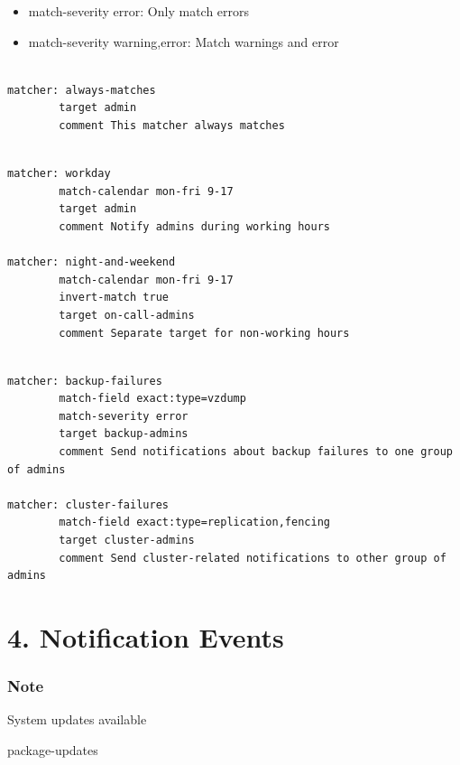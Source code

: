 \begin{itemize}[leftmargin=2cm]

	\item match-severity error: Only match errors

	\item match-severity warning,error: Match warnings and error

\end{itemize}

\begin{lstlisting}

matcher: always-matches
        target admin
        comment This matcher always matches

\end{lstlisting}

\begin{lstlisting}

matcher: workday
        match-calendar mon-fri 9-17
        target admin
        comment Notify admins during working hours

matcher: night-and-weekend
        match-calendar mon-fri 9-17
        invert-match true
        target on-call-admins
        comment Separate target for non-working hours

\end{lstlisting}

\begin{lstlisting}

matcher: backup-failures
        match-field exact:type=vzdump
        match-severity error
        target backup-admins
        comment Send notifications about backup failures to one group of admins

matcher: cluster-failures
        match-field exact:type=replication,fencing
        target cluster-admins
        comment Send cluster-related notifications to other group of admins

\end{lstlisting}


\section{4. Notification Events}

\subsubsection{Note}

System updates available

package-updates


